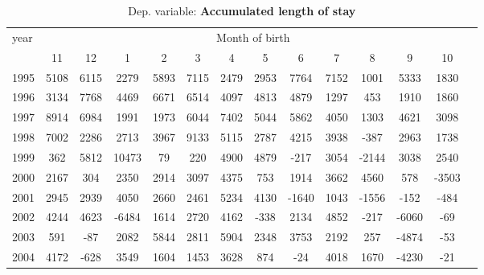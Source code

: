 \begin{table}[H] \begin{threeparttable} \centering \caption{Dep. variable: \textbf{Accumulated length of stay}} {\def\sym#1{\ifmmode^{#1}\else\(^{#1}\)\fi} \begin{tabular}{l*{13}{c}} \toprule year & \multicolumn{12}{c}{Month of birth} \\ \cmidrule(lr){2-13} 
            &          11&          12&           1&           2&           3&           4&           5&           6&           7&           8&           9&          10\\
1995        &        5108&        6115&        2279&        5893&        7115&        2479&        2953&        7764&        7152&        1001&        5333&        1830\\
1996        &        3134&        7768&        4469&        6671&        6514&        4097&        4813&        4879&        1297&         453&        1910&        1860\\
1997        &        8914&        6984&        1991&        1973&        6044&        7402&        5044&        5862&        4050&        1303&        4621&        3098\\
1998        &        7002&        2286&        2713&        3967&        9133&        5115&        2787&        4215&        3938&        -387&        2963&        1738\\
1999        &         362&        5812&       10473&          79&         220&        4900&        4879&        -217&        3054&       -2144&        3038&        2540\\
2000        &        2167&         304&        2350&        2914&        3097&        4375&         753&        1914&        3662&        4560&         578&       -3503\\
2001        &        2945&        2939&        4050&        2660&        2461&        5234&        4130&       -1640&        1043&       -1556&        -152&        -484\\
2002        &        4244&        4623&       -6484&        1614&        2720&        4162&        -338&        2134&        4852&        -217&       -6060&         -69\\
2003        &         591&         -87&        2082&        5844&        2811&        5904&        2348&        3753&        2192&         257&       -4874&         -53\\
2004        &        4172&        -628&        3549&        1604&        1453&        3628&         874&         -24&        4018&        1670&       -4230&         -21\\

\end{tabular}}
\end{threeparttable}
\end{table}
